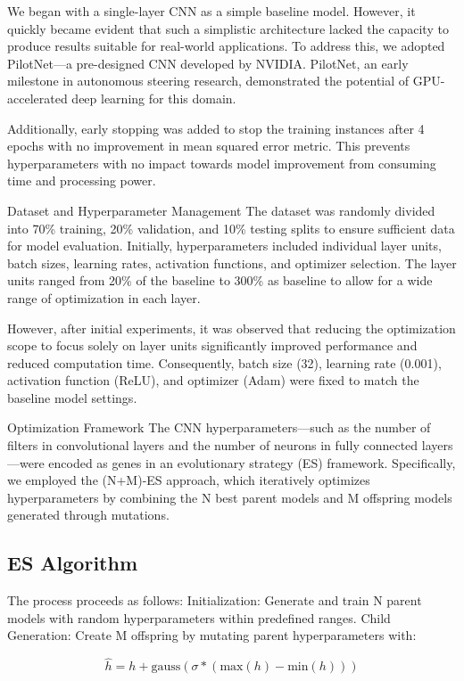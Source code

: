 \documentclass[conference]{IEEEtran}
\begin{document}
We began with a single-layer CNN as a simple baseline model. However, it quickly became evident that such a simplistic architecture lacked the capacity to produce results suitable for real-world applications. To address this, we adopted PilotNet—a pre-designed CNN developed by NVIDIA. PilotNet, an early milestone in autonomous steering research, demonstrated the potential of GPU-accelerated deep learning for this domain.

Additionally, early stopping was added to stop the training instances after 4 epochs with no improvement in mean squared error metric. This prevents hyperparameters with no impact towards model improvement from consuming time and processing power.

Dataset and Hyperparameter Management
The dataset was randomly divided into 70\% training, 20\% validation, and 10\% testing splits to ensure sufficient data for model evaluation. Initially, hyperparameters included individual layer units, batch sizes, learning rates, activation functions, and optimizer selection. The layer units ranged from 20\% of the baseline to 300\% as baseline to allow for a wide range of optimization in each layer.

However, after initial experiments, it was observed that reducing the optimization scope to focus solely on layer units significantly improved performance and reduced computation time. Consequently, batch size (32), learning rate (0.001), activation function (ReLU), and optimizer (Adam) were fixed to match the baseline model settings.

Optimization Framework
The CNN hyperparameters—such as the number of filters in convolutional layers and the number of neurons in fully connected layers—were encoded as genes in an evolutionary strategy (ES) framework. Specifically, we employed the (N+M)-ES approach, which iteratively optimizes hyperparameters by combining the N best parent models and M offspring models generated through mutations.


\subsection{ES Algorithm}
The process proceeds as follows:
Initialization: Generate and train N parent models with random hyperparameters within predefined ranges.
Child Generation: Create M offspring by mutating parent hyperparameters with:

\begin{equation}
    \hat{h} = h + \text{gauss}(\sigma * (\text{max}(h) - \text{min}(h)))
\end{equation}
\end{document}
